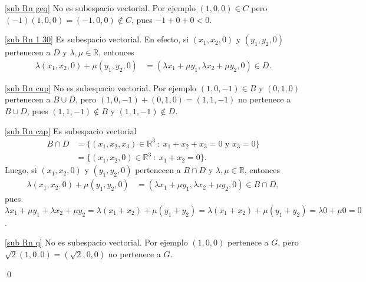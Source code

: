 \begin{enumerate}[topsep=6pt, itemsep=.4cm]
    \ref{sub Rn geq} No es subespacio vectorial. Por ejemplo $(1,0,0) \in C$ pero $(-1)(1,0,0) = (-1,0,0) \not\in C$, pues $-1+0+0<0$.

    \ref{sub Rn 1 30} Es subespacio vectorial. En efecto, si $(x_1, x_2 ,0)$ y $(y_1, y_2 ,0)$ pertenecen a $D$ y $\lambda,\mu\in\mathbb{R}$, entonces
    \begin{align*}
        \lambda(x_1, x_2 ,0)+\mu(y_1, y_2 ,0)&=(\lambda x_1+\mu y_1, \lambda x_2+\mu y_2, 0) \in D.
    \end{align*}

    \ref{sub Rn cup} No es subespacio vectorial. Por ejemplo $(1,0,-1) \in B$ y $(0,1,0)$ pertenecen a $B\cup D$, pero $(1,0,-1)+(0,1,0)=(1,1,-1)$ no pertenece a $B\cup D$, pues $(1,1,-1) \not\in B$ y $(1,1,-1) \not\in D$.

    \ref{sub Rn cap} Es subespacio vectorial
    \begin{align*}
        B \cap D &= \{(x_1, x_2 ,x_3) \in \mathbb{R}^3 \ : \ x_1 + x_2 + x_3=0 \text{ y } x_3=0\} \\&= \{(x_1, x_2 ,0) \in \mathbb{R}^3 \ : \ x_1 + x_2 =0\}.    
    \end{align*}
    Luego, si $(x_1, x_2 ,0)$ y $(y_1, y_2 ,0)$ pertenecen a $B\cap D$ y $\lambda,\mu\in\mathbb{R}$, entonces
    \begin{align*}
        \lambda(x_1, x_2 ,0)+\mu(y_1, y_2 ,0)&=(\lambda x_1+\mu y_1, \lambda x_2+\mu y_2, 0) \in B\cap D,
    \end{align*}
    pues $\lambda x_1+\mu y_1 + \lambda x_2+\mu y_2 = \lambda(x_1+ x_2) + \mu(y_1+ y_2) = \lambda(x_1+ x_2) + \mu(y_1+ y_2) = \lambda 0 + \mu 0 = 0$.

    \ref{sub Rn q} No es subespacio vectorial. Por ejemplo $(1,0,0)$ pertenece a $G$, pero $\sqrt{2}(1,0,0)=(\sqrt{2},0 ,0)$ no pertenece a $G$.


    \qed     

    \end{enumerate}

